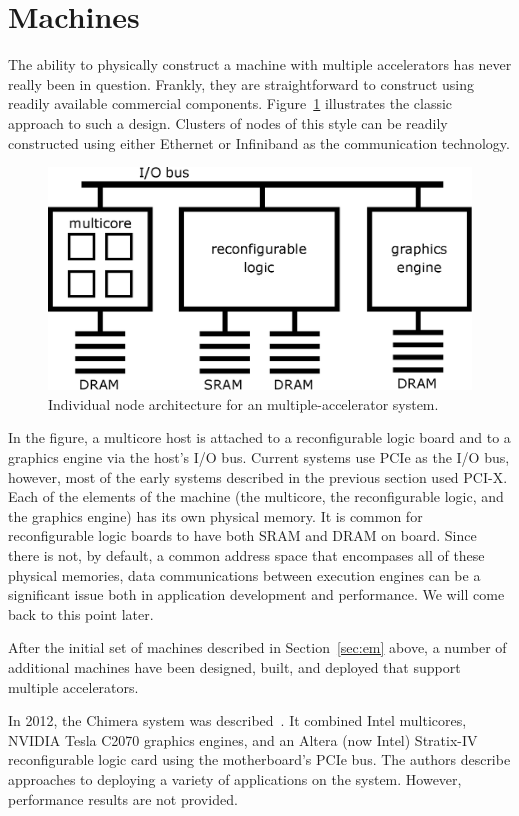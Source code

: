 \section{Machines}
\label{sec:machines}

The ability to physically construct a machine with multiple accelerators
has never really been in question.  Frankly, they are straightforward to
construct using readily available commercial components.
Figure~\ref{fig:nodearch} illustrates the classic approach to such a design.
Clusters of nodes of this style can be readily constructed using either
Ethernet or Infiniband as the communication technology.

\begin{figure}[ht]
\centering
\includegraphics[width=0.75\linewidth]{nodearch}
\caption{Individual node architecture for an multiple-accelerator system.}
\label{fig:nodearch}
\end{figure}

In the figure, a multicore host is attached to a reconfigurable logic board
and to a graphics engine via the host's I/O bus.  Current systems use
PCIe as the I/O bus, however, most of the early systems described in
the previous section used PCI-X.
Each of the elements of the machine (the multicore, the reconfigurable
logic, and the graphics engine) has its own physical memory.  It is common
for reconfigurable logic boards to have both SRAM and DRAM on board.
Since there is not, by default, a common address space that encompases
all of these physical memories, data communications between execution
engines can be a significant issue both in application development and
performance.  We will come back to this point later.

After the initial set of machines described in Section~\ref{sec:em} above,
a number of additional machines have been designed, built, and deployed
that support multiple accelerators.

In 2012, the Chimera system was described~\cite{ibs12}.
It combined Intel multicores, NVIDIA Tesla C2070 graphics engines,
and an Altera (now Intel) Stratix-IV reconfigurable logic card using
the motherboard's PCIe bus. The authors describe approaches to deploying
a variety of applications on the system. However, performance results
are not provided.

